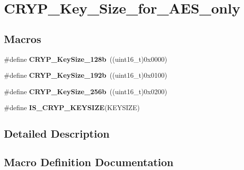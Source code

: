 \hypertarget{group___c_r_y_p___key___size__for___a_e_s__only}{}\section{C\+R\+Y\+P\+\_\+\+Key\+\_\+\+Size\+\_\+for\+\_\+\+A\+E\+S\+\_\+only}
\label{group___c_r_y_p___key___size__for___a_e_s__only}
\subsection*{Macros}
\begin{DoxyCompactItemize}
\item 
\hypertarget{group___c_r_y_p___key___size__for___a_e_s__only_gacb2dbb80e15f19c40ed6718082e0dbdc}{}\#define {\bfseries C\+R\+Y\+P\+\_\+\+Key\+Size\+\_\+128b}~((uint16\+\_\+t)0x0000)\label{group___c_r_y_p___key___size__for___a_e_s__only_gacb2dbb80e15f19c40ed6718082e0dbdc}

\item 
\hypertarget{group___c_r_y_p___key___size__for___a_e_s__only_ga4da085b0764310a43cdcb5d2c9bc871e}{}\#define {\bfseries C\+R\+Y\+P\+\_\+\+Key\+Size\+\_\+192b}~((uint16\+\_\+t)0x0100)\label{group___c_r_y_p___key___size__for___a_e_s__only_ga4da085b0764310a43cdcb5d2c9bc871e}

\item 
\hypertarget{group___c_r_y_p___key___size__for___a_e_s__only_ga96e5c43517cc20077d01c25fb6045505}{}\#define {\bfseries C\+R\+Y\+P\+\_\+\+Key\+Size\+\_\+256b}~((uint16\+\_\+t)0x0200)\label{group___c_r_y_p___key___size__for___a_e_s__only_ga96e5c43517cc20077d01c25fb6045505}

\item 
\#define {\bfseries I\+S\+\_\+\+C\+R\+Y\+P\+\_\+\+K\+E\+Y\+S\+I\+Z\+E}(K\+E\+Y\+S\+I\+Z\+E)
\end{DoxyCompactItemize}


\subsection{Detailed Description}


\subsection{Macro Definition Documentation}
\hypertarget{group___c_r_y_p___key___size__for___a_e_s__only_ga129c62b908fd19c23c50fef20c1245d3}{}
